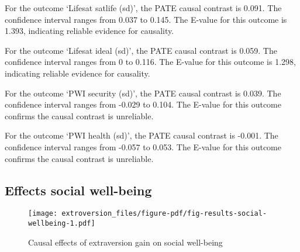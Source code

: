 \documentclass[
  singlecolumn]{report}
\begin{document}
For the outcome `Lifesat satlife (sd)', the PATE causal contrast is
0.091. The confidence interval ranges from 0.037 to 0.145. The E-value
for this outcome is 1.393, indicating reliable evidence for causality.

For the outcome `Lifesat ideal (sd)', the PATE causal contrast is 0.059.
The confidence interval ranges from 0 to 0.116. The E-value for this
outcome is 1.298, indicating reliable evidence for causality.

For the outcome `PWI security (sd)', the PATE causal contrast is 0.039.
The confidence interval ranges from -0.029 to 0.104. The E-value for
this outcome confirms the causal contrast is unreliable.

For the outcome `PWI health (sd)', the PATE causal contrast is -0.001.
The confidence interval ranges from -0.057 to 0.053. The E-value for
this outcome confirms the causal contrast is unreliable.

\hypertarget{effects-social-well-being}{%
\subsection{Effects social well-being}\label{effects-social-well-being}}

\begin{figure}

{\centering \texttt{[image: extroversion\_files/figure-pdf/fig-results-social-wellbeing-1.pdf]}

}

\caption{\label{fig-results-social-wellbeing}Causal effects of
extraversion gain on social well-being}

\end{figure}
\end{document}
